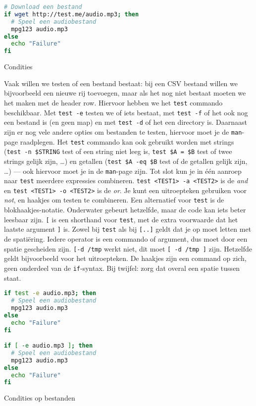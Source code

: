 \begin{listing}
\begin{lstlisting}[language=Bash]
# Download een bestand
if wget http://test.me/audio.mp3; then
  # Speel een audiobestand
  mpg123 audio.mp3
else
  echo "Failure"
fi
\end{lstlisting}
\caption{Condities}
\end{listing}

Vaak willen we testen of een bestand bestaat: bij een CSV bestand willen we bijvoorbeeld een nieuwe rij toevoegen, maar als het nog niet bestaat moeten we het maken met de header row. Hiervoor hebben we het \texttt{test} commando beschikbaar. Met \texttt{test\ -e} testen we of iets bestaat, met \texttt{test\ -f} of het ook nog een bestand is (en geen map) en met \texttt{test\ -d} of het een directory is. Daarnaast zijn er nog vele andere opties om bestanden te testen, hiervoor moet je de \texttt{man}-page raadplegen. Het \texttt{test} commando kan ook gebruikt worden met strings (\texttt{test\ -n\ \$STRING} test of een string niet leeg is, \texttt{test\ \$A\ =\ \$B} test of twee strings gelijk zijn, \ldots) en getallen (\texttt{test\ \$A\ -eq\ \$B} test of de getallen gelijk zijn, \ldots) --- ook hiervoor moet je in de \texttt{man}-page zijn. Tot slot kun je in één aanroep naar \texttt{test} meerdere expressies combineren. \texttt{test\ \textless{}TEST1\textgreater{}\ -a\ \textless{}TEST2\textgreater{}} is de \emph{and} en \texttt{test\ \textless{}TEST1\textgreater{}\ -o\ \textless{}TEST2\textgreater{}} is de \emph{or}. Je kunt een uitroepteken gebruiken voor \emph{not}, en haakjes om testen te combineren. Een alternatief voor \texttt{test} is de blokhaakjes-notatie. Onderwater gebeurt hetzelfde, maar de code kan iets beter leesbaar zijn. \texttt{{[}} is een shorthand voor \texttt{test}, met de extra voorwaarde dat het laatste argument \texttt{{]}} is. Zowel bij \texttt{test} als bij \texttt{{[}..{]}} geldt dat je op moet letten met de spatiëring. Iedere operator is een commando of argument, dus moet door een spatie gescheiden zijn. \texttt{{[}-d\ \textquotesingle{}/tmp\textquotesingle{}{]}} werkt niet, dit moet \texttt{{[}\ -d\ \textquotesingle{}/tmp\textquotesingle{}\ {]}} zijn. Hetzelfde geldt bijvoorbeeld voor het uitroepteken. De haakjes zijn een command op zich, geen onderdeel van de \texttt{if}-syntax. Bij twijfel: zorg dat overal een spatie tussen staat.

\begin{listing}
\begin{lstlisting}[language=Bash]
if test -e audio.mp3; then
  # Speel een audiobestand
  mpg123 audio.mp3
else
  echo "Failure"
fi

if [ -e audio.mp3 ]; then
  # Speel een audiobestand
  mpg123 audio.mp3
else
  echo "Failure"
fi
\end{lstlisting}
\caption{Condities op bestanden}
\end{listing}

